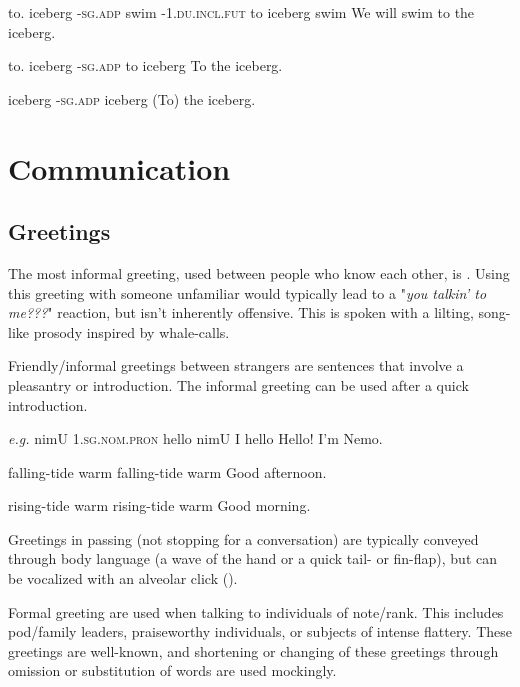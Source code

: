 \documentclass[11pt]{report}
\newcommand{\h}{{$^h$}}
\newcommand{\R}{{\*r}}
\begin{document}
{to. iceberg \textsc{-sg.adp} swim -\textsc{1.du.incl.fut}}
{to iceberg {} swim {} }
{We will swim to the iceberg.}

{to. iceberg \textsc{-sg.adp}}
{to iceberg {}}
{To the iceberg.}

{iceberg \textsc{-sg.adp}}
{iceberg {}}
{(To) the iceberg.}


\chapter{Communication}

\section{Greetings}
The most informal greeting, used between people who know each other, is \textit{}.  Using this greeting with someone unfamiliar would typically lead to a "\textit{you talkin' to me???}" reaction, but isn't inherently offensive.  This is spoken with a lilting, song-like prosody inspired by whale-calls.

Friendly/informal greetings between strangers are sentences that involve a pleasantry or introduction.  The informal greeting \textit{} can be used after a quick introduction.

\textit{e.g.}
\trigloss[preamble={\textipa{nimU wlAt\h{} euZ}}]
{\textipa{nimU} \textipa{wlAt\h} \textipa{euZ}}
{nimU \textsc{1.sg.nom.pron} hello}
{nimU I hello}
{Hello! I'm Nemo.}

\trigloss[preamble={\textipa{saZIm a\R{}lU}}]
{\textipa{saZIm} \textipa{a\R{}lU}}
{falling-tide warm}
{falling-tide warm}
{Good afternoon.}

\trigloss[preamble={\textipa{ziZIm a\R{}lU}}]
{\textipa{ziZIm} \textipa{a\R{}lU}}
{rising-tide warm}
{rising-tide warm}
{Good morning.}

Greetings in passing (not stopping for a conversation) are typically conveyed through body language (a wave of the hand or a quick tail- or fin-flap), but can be vocalized with an alveolar click (\textit{\textipa{||}}).

Formal greeting are used when talking to individuals of note/rank.  This includes pod/family leaders, praiseworthy individuals, or subjects of intense flattery.  These greetings are well-known, and shortening or changing of these greetings through omission or substitution of words are used mockingly.
\end{document}
